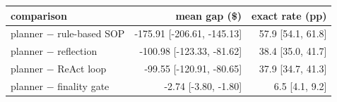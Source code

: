 \begin{tabular}{lrr}
\toprule
comparison & mean gap (\$) & exact rate (pp) \\
\midrule
planner $-$ rule-based SOP & -175.91 [-206.61, -145.13] & 57.9 [54.1, 61.8] \\
planner $-$ reflection & -100.98 [-123.33, -81.62] & 38.4 [35.0, 41.7] \\
planner $-$ ReAct loop & -99.55 [-120.91, -80.65] & 37.9 [34.7, 41.3] \\
planner $-$ finality gate & -2.74 [-3.80, -1.80] & 6.5 [4.1, 9.2] \\
\bottomrule
\end{tabular}